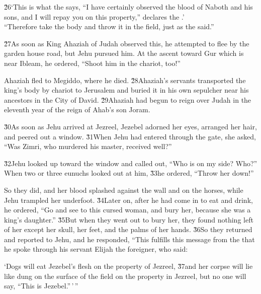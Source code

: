 \begin{poetry}
\poeml \v{26}`This is what the  says, ``I have certainly observed the blood of Naboth and his sons, and I will repay you on this property,'' declares the .' \\
\poeml ``Therefore take the body and throw it in the field, just as the  said.''
\end{poetry}

\v{27}As soon as King Ahaziah of Judah observed this, he attempted to flee by the garden house road, but Jehu pursued him. At the ascent toward Gur which is near Ibleam, he ordered, ``Shoot him in the chariot, too!''

Ahaziah fled to Megiddo, where he died. \v{28}Ahaziah's servants transported the king's body by chariot to Jerusalem and buried it in his own sepulcher near his ancestors in the City of David. \v{29}Ahaziah had begun to reign over Judah in the eleventh year of the reign of Ahab's son Joram.

\v{30}As soon as Jehu arrived at Jezreel, Jezebel adorned her eyes, arranged her hair, and peered out a window. \v{31}When Jehu had entered through the gate, she asked, ``Was Zimri, who murdered his master, received well?''

\v{32}Jehu looked up toward the window and called out, ``Who is on my side? Who?'' When two or three eunuchs looked out at him, \v{33}he ordered, ``Throw her down!''

So they did, and her blood splashed against the wall and on the horses, while Jehu trampled her underfoot. \v{34}Later on, after he had come in to eat and drink, he ordered, ``Go and see to this cursed woman, and bury her, because she was a king's daughter.'' \v{35}But when they went out to bury her, they found nothing left of her except her skull, her feet, and the palms of her hands. \v{36}So they returned and reported to Jehu, and he responded, ``This fulfills this message from the  that he spoke through his servant Elijah the foreigner, who said:

\begin{poetry}
\poeml `Dogs will eat Jezebel's flesh on the property of Jezreel, \v{37}and her corpse will lie like dung on the surface of the field on the property in Jezreel, but no one will say, ``This is Jezebel.''\,'\,''
\end{poetry}

